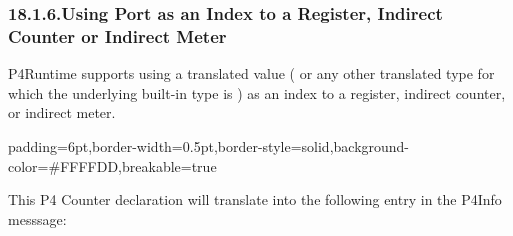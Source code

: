 \documentclass[11pt]{article}
\begin{document}
{%
\subsubsection{18.1.6.\hspace*{0.5em}Using Port as an Index to a Register, Indirect Counter or Indirect Meter}\label{sec-using-port-as-an-index-to-a-register-indirect-counter-or-indirect-meter}%

\noindent{}P4Runtime supports using a translated value ( or any other translated
type for which the underlying built-in type is ) as an index to a
register, indirect counter, or indirect meter.%

\begin{mdbmargintb}{6pt}{6pt}%
\begin{mdblock}{padding=6pt,border-width=0.5pt,border-style=solid,background-color=\#FFFFDD,breakable=true}%
\begin{mdpre}%
\end{mdpre}%
\end{mdblock}%
\end{mdbmargintb}%

\noindent{}This P4 Counter declaration will translate into the following entry in the
P4Info messsage:%

}
\end{document}
